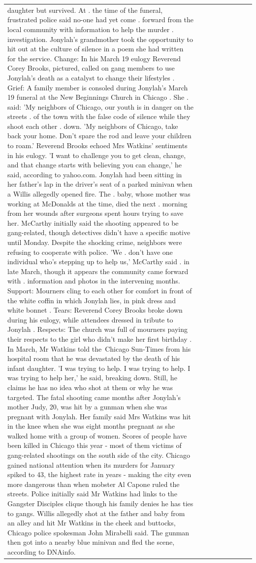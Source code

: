 \begin{table}[H]
\begin{tabular}{lllrlllll}
daughter but survived. At . the time of the funeral, frustrated police said no-one had yet come . forward from the local community with information to help the murder . investigation. Jonylah's grandmother took the opportunity to hit out at the culture of silence in a poem she had written for the service. Change: In his March 19 eulogy Reverend Corey Brooks, pictured, called on gang members to use Jonylah's death as a catalyst to change their lifestyles . Grief: A family member is consoled during Jonylah's March 19 funeral at the New Beginnings Church in Chicago . She . said: 'My neighbors of Chicago, our youth is in danger on the streets . of the town with the false code of silence while they shoot each other . down. 'My neighbors of Chicago, take back your home. Don't spare the rod and leave your children to roam.' Reverend Brooks echoed Mrs Watkins' sentiments in his eulogy. 'I want to challenge you to get clean, change, and that change starts with believing you can change,' he said, according to yahoo.com. Jonylah had been sitting in her father's lap in the driver's seat of a parked minivan when a Willis allegedly opened fire. The . baby, whose mother was working at McDonalds at the time, died the next . morning from her wounds after surgeons spent hours trying to save her. McCarthy initially said the shooting appeared to be gang-related, though detectives didn't have a specific motive until Monday. Despite the shocking crime, neighbors were refusing to cooperate with police. 'We . don't have one individual who's stepping up to help us,' McCarthy said . in late March, though it appears the community came forward with . information and photos in the intervening months. Support: Mourners cling to each other for comfort in front of the white coffin in which Jonylah lies, in pink dress and white bonnet . Tears: Reverend Corey Brooks broke down during his eulogy, while attendees dressed in tribute to Jonylah . Respects: The church was full of mourners paying their respects to the girl who didn't make her first birthday . In March, Mr Watkins told the Chicago Sun-Times from his hospital room that he was devastated by the death of his infant daughter. 'I was trying to help. I was trying to help. I was trying to help her,' he said, breaking down. Still, he claims he has no idea who shot at them or why he was targeted. The fatal shooting came months after Jonylah's mother Judy, 20, was hit by a gunman when she was pregnant with Jonylah. Her family said Mrs Watkins was hit in the knee when she was eight months pregnant as she walked home with a group of women. Scores of people have been killed in Chicago this year - most of them victims of gang-related shootings on the south side of the city. Chicago gained national attention when its murders for January spiked to 43, the highest rate in years - making the city even more dangerous than when mobster Al Capone ruled the streets. Police initially said Mr Watkins had links to the Gangster Disciples clique though his family denies he has ties to gangs. Willis allegedly shot at the father and baby from an alley and hit Mr Watkins in the cheek and buttocks, Chicago police spokesman John Mirabelli said. The gunman then got into a nearby blue minivan and fled the scene, according to DNAinfo. 
\end{tabular}
\end{table}
